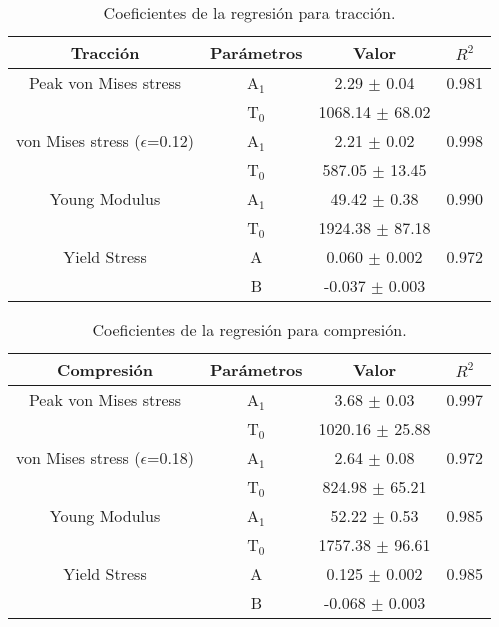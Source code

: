 
\begin{table}[htp]
\caption[Coeficientes de la regresión para tracción.]{Coeficientes de la regresión para tracción.}
\begin{center}
\begin{tabular}{*{4}{c}}
\hline
\textbf{Tracción} & Parámetros & Valor & $R^{2}$ \\ \hline \hline
Peak von Mises stress & A$_{1}$ & 2.29 $\pm$ 0.04 & 0.981 \\
 & T$_{0}$ & 1068.14 $\pm$ 68.02 & \\ \hline
von Mises stress ($\epsilon$=0.12) & A$_{1}$ & 2.21 $\pm$ 0.02 & 0.998 \\
 & T$_{0}$ & 587.05 $\pm$ 13.45 & \\ \hline
Young Modulus & A$_{1}$ & 49.42 $\pm$ 0.38 & 0.990 \\
 & T$_{0}$ & 1924.38 $\pm$ 87.18 & \\ \hline
Yield Stress & A & 0.060 $\pm$ 0.002 & 0.972 \\
 & B & -0.037 $\pm$ 0.003 & \\ \hline
\end{tabular}
\end{center}
\label{C3:tb:initPropsTen}
\end{table}

\begin{table}[htp]
\caption[Coeficientes de la regresión para compresión.]{Coeficientes de la regresión para compresión.}
\begin{center}
\begin{tabular}{*{4}{c}}
\hline
\textbf{Compresión} & Parámetros & Valor & $R^{2}$ \\ \hline \hline
Peak von Mises stress & A$_{1}$ & 3.68 $\pm$ 0.03 & 0.997 \\
 & T$_{0}$ & 1020.16 $\pm$ 25.88 & \\ \hline
von Mises stress ($\epsilon$=0.18) & A$_{1}$ & 2.64 $\pm$ 0.08 & 0.972 \\
 & T$_{0}$ & 824.98 $\pm$ 65.21 & \\ \hline
Young Modulus & A$_{1}$ & 52.22 $\pm$ 0.53 & 0.985 \\
 & T$_{0}$ & 1757.38 $\pm$ 96.61 & \\ \hline
Yield Stress & A & 0.125 $\pm$ 0.002 & 0.985 \\
 & B & -0.068 $\pm$ 0.003 & \\ \hline
\end{tabular}
\end{center}
\label{C3:tb:initPropsComp}
\end{table}

